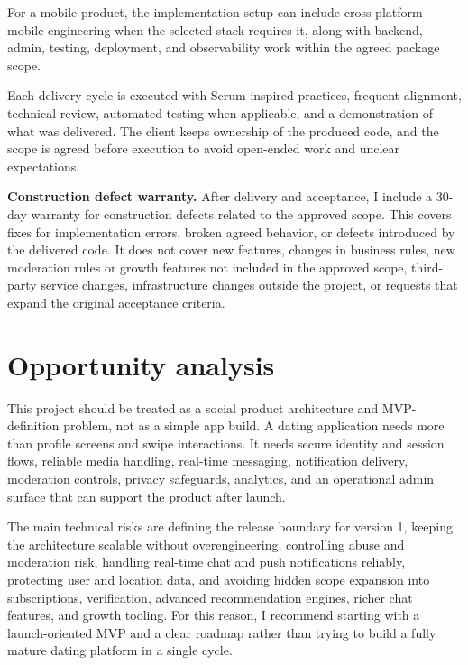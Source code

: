 \documentclass[11pt,a4paper]{article}
\begin{document}
For a mobile product, the implementation setup can include cross-platform mobile engineering when the selected stack requires it, along with backend, admin, testing, deployment, and observability work within the agreed package scope.\par

Each delivery cycle is executed with Scrum-inspired practices, frequent alignment, technical review, automated testing when applicable, and a demonstration of what was delivered. The client keeps ownership of the produced code, and the scope is agreed before execution to avoid open-ended work and unclear expectations.\par

\textbf{Construction defect warranty.} After delivery and acceptance, I include a 30-day warranty for construction defects related to the approved scope. This covers fixes for implementation errors, broken agreed behavior, or defects introduced by the delivered code. It does not cover new features, changes in business rules, new moderation rules or growth features not included in the approved scope, third-party service changes, infrastructure changes outside the project, or requests that expand the original acceptance criteria.\par

\section*{Opportunity analysis}

This project should be treated as a social product architecture and MVP-definition problem, not as a simple app build. A dating application needs more than profile screens and swipe interactions. It needs secure identity and session flows, reliable media handling, real-time messaging, notification delivery, moderation controls, privacy safeguards, analytics, and an operational admin surface that can support the product after launch.\par

The main technical risks are defining the release boundary for version 1, keeping the architecture scalable without overengineering, controlling abuse and moderation risk, handling real-time chat and push notifications reliably, protecting user and location data, and avoiding hidden scope expansion into subscriptions, verification, advanced recommendation engines, richer chat features, and growth tooling. For this reason, I recommend starting with a launch-oriented MVP and a clear roadmap rather than trying to build a fully mature dating platform in a single cycle.\par
\end{document}
